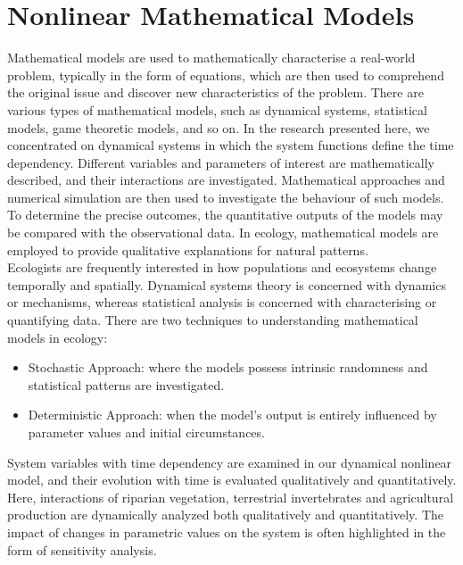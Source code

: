 \documentclass[12pt,a4wide]{report}
\numberwithin{equation}{chapter}
\numberwithin{theorem}{chapter}
\begin{document}
\section{Nonlinear Mathematical Models}
Mathematical models are used to mathematically characterise a real-world problem, typically in the form of equations, which are then used to comprehend the original issue and discover new characteristics of the problem. There are various types of mathematical models, such as dynamical systems, statistical models, game theoretic models, and so on. In the research presented here, we concentrated on dynamical systems in which the system functions define the time dependency. Different variables and parameters of interest are mathematically described, and their interactions are investigated. Mathematical approaches and numerical simulation are then used to investigate the behaviour of such models. To determine the precise outcomes, the quantitative outputs of the models may be compared with the observational data. In ecology, mathematical models are employed to provide qualitative explanations for natural patterns.\\
Ecologists are frequently interested in how populations and ecosystems change temporally and spatially. Dynamical systems theory is concerned with dynamics or mechanisms, whereas statistical analysis is concerned with characterising or quantifying data. There are two techniques to understanding mathematical models in ecology: 
\begin{itemize}
    \item Stochastic Approach: where the models possess intrinsic randomness and statistical patterns are investigated.
    \item Deterministic Approach: when the model's output is entirely influenced by parameter values and initial circumstances.
\end{itemize}
System variables with time dependency are examined in our dynamical nonlinear model, and their evolution with time is evaluated qualitatively and quantitatively. Here, interactions of riparian vegetation, terrestrial invertebrates and agricultural production are dynamically analyzed both qualitatively and quantitatively. The impact of changes in parametric values on the system is often highlighted in the form of sensitivity analysis.
\end{document}
